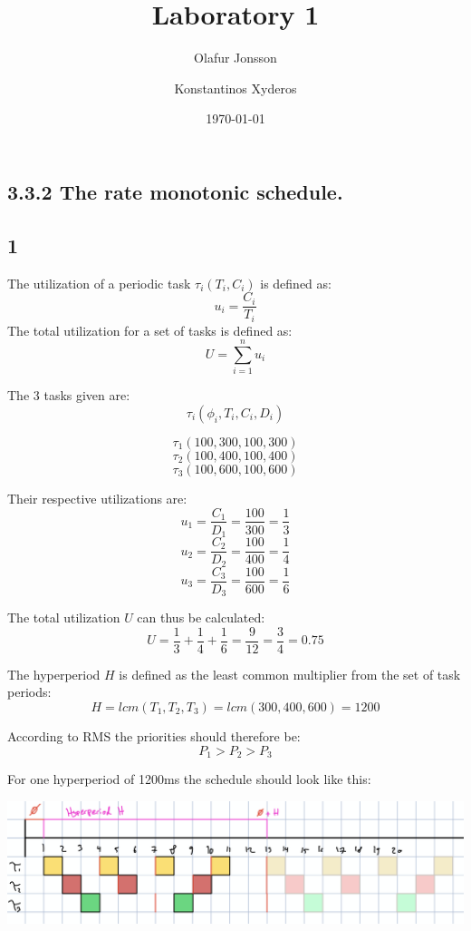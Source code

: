 \documentclass[12pt]{article}
\title{Laboratory 1}
\author{
        Olafur Jonsson \\
            \and
        Konstantinos Xyderos \\
}
\date{\today}
\begin{document}
\maketitle
\subsection*{3.3.2 The rate monotonic schedule.}

\subsection*{1}
The utilization of a periodic task $\tau_i(T_i,C_i)$ is defined as:
\[u_i = \frac{C_i}{T_i}\]
The total utilization for a set of tasks is defined as:
\[U = \sum_{i=1}^{n} u_i\]

The 3 tasks given are:
\[\tau_i(\phi_i, T_i, C_i, D_i)\]

\[\tau_1(100, 300, 100, 300)\]
\[\tau_2(100, 400, 100, 400)\]
\[\tau_3(100, 600, 100, 600)\]

Their respective utilizations are:
\[u_1 = \frac{C_1}{D_1} = \frac{100}{300} = \frac{1}{3}\]
\[u_2 = \frac{C_2}{D_2} = \frac{100}{400} = \frac{1}{4}\]
\[u_3 = \frac{C_3}{D_3} = \frac{100}{600} = \frac{1}{6}\]

The total utilization $U$ can thus be calculated:
\[U = \frac{1}{3} + \frac{1}{4} + \frac{1}{6} = \frac{9}{12} = \frac{3}{4} = 0.75\]

The hyperperiod $H$ is defined as the least common multiplier from the set of task periods:
\[H = lcm(T_1, T_2, T_3) = lcm (300, 400, 600) = 1200\]

According to RMS the priorities should therefore be:
\[P_1 > P_2 > P_3\]

For one hyperperiod of 1200ms the schedule should look like this:

\includegraphics[width=0.9\linewidth]{1-rate-monotonic-schedule}
\end{document}
